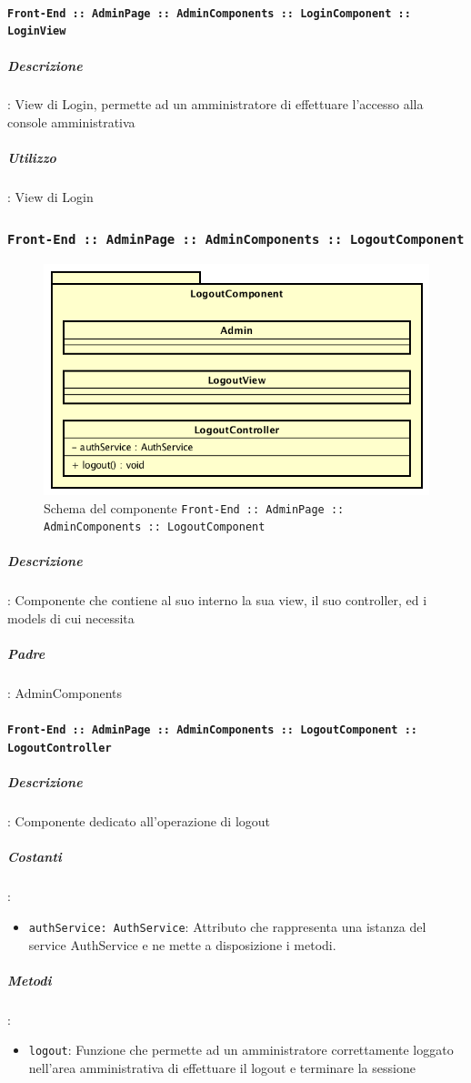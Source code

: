 \documentclass[../DefinizioneDiProdotto_v3.0.0.tex]{subfiles}
\begin{document}
	  		\paragraph{\texttt{Front-End :: AdminPage :: AdminComponents :: LoginComponent :: LoginView}}
				\subparagraph{Descrizione}: View di Login, permette ad un amministratore di effettuare l'accesso alla console amministrativa
				\subparagraph{Utilizzo}: View di Login
\newpage
	\subsubsection{\texttt{Front-End :: AdminPage :: AdminComponents :: LogoutComponent}}
	\begin{figure}[!h]
		\centering
		\includegraphics[scale=0.7]{Architettura/Front-End/AdminPage/AdminComponents/LogoutComponent.png}
		\caption{Schema del componente \texttt{Front-End :: AdminPage :: AdminComponents :: LogoutComponent}}
	\end{figure}

			\subparagraph{Descrizione}: Componente che contiene al suo interno la sua view, il suo controller, ed i models di cui necessita
			\subparagraph{Padre}: AdminComponents
	  		\paragraph{\texttt{Front-End :: AdminPage :: AdminComponents :: LogoutComponent :: LogoutController}}
				\subparagraph{Descrizione}: Componente dedicato all'operazione di logout
				\subparagraph{Costanti}:
				\begin{itemize}
					\item \texttt{authService: AuthService}: Attributo che rappresenta una istanza del service AuthService e ne mette a disposizione i metodi.
				\end{itemize}
				\subparagraph{Metodi}:
				\begin{itemize}
					\item \texttt{logout}: Funzione che permette ad un amministratore correttamente loggato nell'area amministrativa di effettuare il logout e terminare la sessione
				\end{itemize}\vspace{0.5em}
\end{document}
